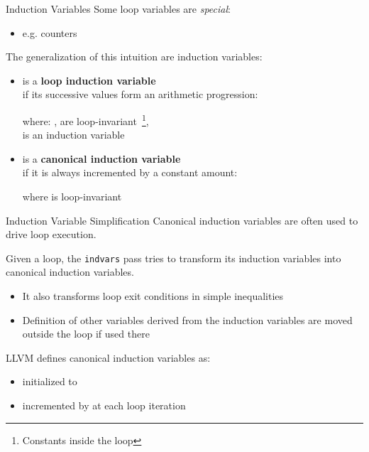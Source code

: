 \begin{frame}{Induction Variables}
Some loop variables are \emph{special}:

\begin{itemize}
\item e.g. counters
\end{itemize}

\vfill
The generalization of this intuition are \alert{induction variables}:

\begin{itemize}
\item {} is a \textbf{loop induction variable}\\
		  if its successive values form
      an arithmetic progression:

      \begin{center}
      \end{center}

      where:
      ,  are loop-invariant~\footnote{Constants inside the loop},\\
      \hphantom{where: } is an induction variable
\item {} is a \textbf{canonical induction variable}\\if it is always
      incremented by a constant amount:

      \begin{center}
      \end{center}

      where  is loop-invariant
\end{itemize}
\end{frame}


\begin{frame}{Induction Variable Simplification}
Canonical induction variables are often used to \alert{drive} loop execution.

\vfill

Given a loop, the \texttt{indvars} pass tries to transform its induction variables
into \alert{canonical} induction variables.
\begin{itemize}
\item It also transforms loop exit conditions in simple inequalities
\item Definition of other variables derived from the induction variables
      are moved outside the loop if used there
\end{itemize}

\vfill
LLVM defines canonical induction variables as:

\begin{itemize}
\item initialized to 
\item incremented by  at each loop iteration
\end{itemize}
\end{frame}


